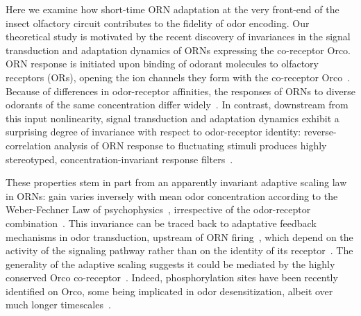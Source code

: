 \documentclass[10pt,prl,aps,showpacs,twocolumn,unsortedaddress,showkeys,linenumbers]{revtex4-1}
\begin{document}
Here we examine how short-time ORN adaptation at the very front-end of the insect olfactory circuit contributes to the fidelity of odor encoding. Our theoretical study is motivated by the recent discovery of invariances in the signal transduction and adaptation dynamics of ORNs expressing the co-receptor Orco. %
ORN response is initiated upon binding of odorant molecules to olfactory receptors (ORs), opening the ion channels they form with the co-receptor Orco~\cite{Orco, orco_structure}. Because of differences in odor-receptor affinities, the responses of ORNs to diverse odorants of the same concentration differ widely~\cite{hallem_carlson,montague2011similar,geosmin}. In contrast, downstream from this input nonlinearity, signal transduction and adaptation dynamics exhibit a surprising degree of invariance with respect to odor-receptor identity: reverse-correlation analysis of ORN response to fluctuating stimuli produces highly stereotyped, concentration-invariant response filters~\cite{martelli,si2017invariances, srinivas_elife}.

These properties stem in part from an apparently invariant adaptive scaling law in ORNs: gain varies inversely with mean odor concentration according to the Weber-Fechner Law of psychophysics~\cite{weber1996eh,fechner2012elemente}, irrespective of the odor-receptor combination~\cite{srinivas_elife,cafaro_WL,cao_WL}. This invariance can be traced back to adaptative feedback mechanisms in odor transduction, upstream of ORN firing~\cite{nagel_wilson_biophysical,cao_WL,cafaro_WL,srinivas_elife}, which depend on the activity of the signaling pathway rather than on the identity of its receptor~\cite{nagel_wilson_biophysical}. 
The generality of the adaptive scaling suggests it could be mediated by the highly conserved Orco co-receptor~\cite{orco_structure,getahun2013insect,getahun2016intracellular,Guo_Smith}. Indeed, phosphorylation sites have been recently identified on Orco, some being implicated in odor desensitization, albeit over much longer timescales~\cite{Guo_Smith_review,Guo_Smith}. 
\end{document}
